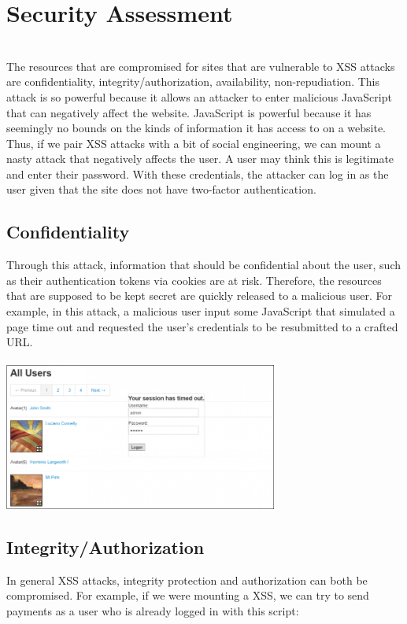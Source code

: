 \documentclass[conference]{IEEEtran}
\begin{document}
\section{Security Assessment}\\

The resources that are compromised for sites that are vulnerable to XSS attacks are confidentiality, integrity/authorization, availability, non-repudiation. This attack is so powerful because it allows an attacker to enter malicious JavaScript that can negatively affect the website. JavaScript is powerful because it has seemingly no bounds on the kinds of information it has access to on a website. Thus, if we pair XSS attacks with a bit of social engineering, we can mount a nasty attack that negatively affects the user. A user may think this is legitimate and enter their password. With these credentials, the attacker can log in as the user given that the site does not have two-factor authentication.

\subsection{Confidentiality}
Through this attack, information that should be confidential about the user, such as their authentication tokens via cookies are at risk. Therefore, the resources that are supposed to be kept secret are quickly released to a malicious user. For example, in this attack, a malicious user input some JavaScript that simulated a page time out and requested the user's credentials to be resubmitted to a crafted URL.\\\\
\includegraphics[width = 9cm]{xss2.png}

\subsection{Integrity/Authorization}
In general XSS attacks, integrity protection and authorization can both be compromised. For example, if we were mounting a XSS, we can try to send payments as a user who is already logged in with this script:\\
\end{document}
